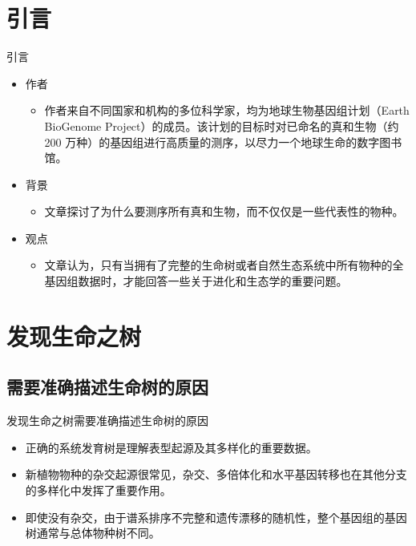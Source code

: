 \documentclass{beamer}
\begin{document}
	\section*{引言}
	\begin{frame}{引言}
		\begin{itemize}
			\item 作者
			\begin{itemize}
				\item 作者来自不同国家和机构的多位科学家，均为地球生物基因组计划（Earth BioGenome Project）的成员。该计划的目标时对已命名的真和生物（约 200 万种）的基因组进行高质量的测序，以尽力一个地球生命的数字图书馆。
			\end{itemize}
			\item 背景
			\begin{itemize}
				\item 文章探讨了为什么要测序所有真和生物，而不仅仅是一些代表性的物种。
			\end{itemize}
			\item 观点
			\begin{itemize}
				\item 文章认为，只有当拥有了完整的生命树或者自然生态系统中所有物种的全基因组数据时，才能回答一些关于进化和生态学的重要问题。
			\end{itemize}
		\end{itemize}
	\end{frame}


	\section{发现生命之树}
	\subsection*{需要准确描述生命树的原因}
	\begin{frame}{发现生命之树}{需要准确描述生命树的原因}
		\begin{itemize}
			\item 正确的系统发育树是理解表型起源及其多样化的重要数据。
			\item 新植物物种的杂交起源很常见，杂交、多倍体化和水平基因转移也在其他分支的多样化中发挥了重要作用。
			\item 即使没有杂交，由于谱系排序不完整和遗传漂移的随机性，整个基因组的基因树通常与总体物种树不同。
		\end{itemize}
	\end{frame}
\end{document}
